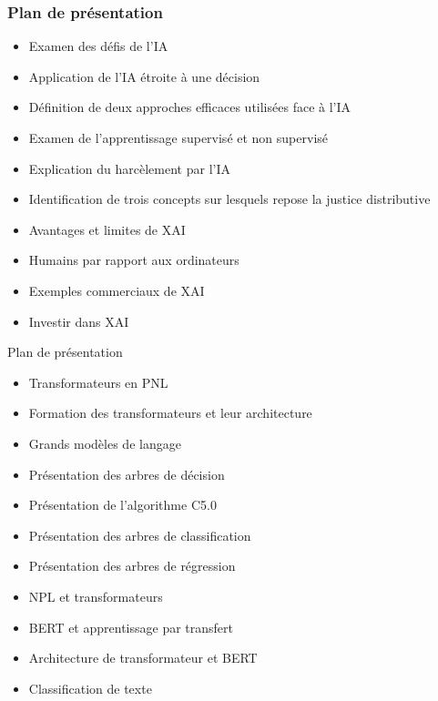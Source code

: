 \documentclass{beamer}
\begin{document}
\begin{frame}
	\frametitle{Plan de présentation}
	\begin{itemize}
		\item Examen des défis de l'IA
		\item Application de l'IA étroite à une décision
		\item Définition de deux approches efficaces utilisées face à l'IA
		\item Examen de l'apprentissage supervisé et non supervisé
		\item Explication du harcèlement par l'IA
		\item Identification de trois concepts sur lesquels repose la justice distributive
		\item Avantages et limites de XAI
		\item Humains par rapport aux ordinateurs
		\item Exemples commerciaux de XAI
		\item Investir dans XAI
	\end{itemize}
\end{frame}
\begin{frame}{Plan de présentation}
	\begin{itemize}
			
	\item Transformateurs en PNL
	\item Formation des transformateurs et leur architecture
	\item Grands modèles de langage
	\item Présentation des arbres de décision
	\item Présentation de l'algorithme C5.0
	\item Présentation des arbres de classification
	\item Présentation des arbres de régression
	\item NPL et transformateurs
	\item BERT et apprentissage par transfert
	\item Architecture de transformateur et BERT
	\item Classification de texte
\end{itemize}
\end{frame}
\end{document}
